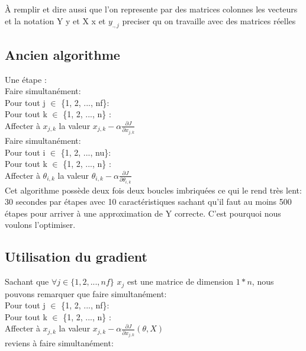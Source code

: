 \documentclass[a4paper,10pt]{article}
\begin{document}
\`{A} remplir et dire aussi que l'on represente par des matrices colonnes les vecteurs et la notation Y y et X x et $y_{.,j}$ preciser qu on travaille avec des matrices réelles
\subsection{Ancien algorithme}

\noindent Une \'{e}tape :\\
\indent Faire simultan\'{e}ment:\\
\indent \indent Pour tout j $\in$ \{1, 2, ..., nf\}:\\
\indent \indent \indent Pour tout k $\in$ \{1, 2, ..., n\} :\\
\indent \indent \indent \indent Affecter \`{a} $x_{j,k}$ la valeur $x_{j,k}-\alpha\frac{\partial J}{\partial x_{j,k}}$\\
\indent Faire simultan\'{e}ment:\\
\indent \indent Pour tout i $\in$ \{1, 2, ..., nu\}:\\
\indent \indent \indent Pour tout k $\in$ \{1, 2, ..., n\} :\\
\indent \indent \indent \indent Affecter \`{a} $\theta_{i,k}$ la valeur $\theta_{i,k}-\alpha\frac{\partial J}{\partial \theta_{i,k}}$\\

\noindent Cet algorithme poss\`{e}de deux fois deux boucles imbriqu\'{e}es ce qui le rend tr\`es lent: 30 secondes par \'{e}tapes avec 10 caract\'{e}ristiques sachant qu'il faut au moins 500 \'{e}tapes pour arriver à une approximation de Y correcte. C'est pourquoi nous voulons l'optimiser.

\subsection{Utilisation du gradient}

Sachant que $\forall j \in \{1, 2, ..., nf\}$ $x_{j}$ est une matrice de dimension $1 * n$, nous pouvons remarquer que faire simultan\'{e}ment:\\

\noindent Pour tout j $\in$ \{1, 2, ..., nf\}:\\
\indent Pour tout k $\in$ \{1, 2, ..., n\} :\\
\indent \indent Affecter \`{a} $x_{j,k}$ la valeur $x_{j,k}-\alpha\frac{\partial J}{\partial x_{j,k}}(\theta, X)$\\

\noindent reviens \`{a} faire simultan\'{e}ment:\\
\end{document}
